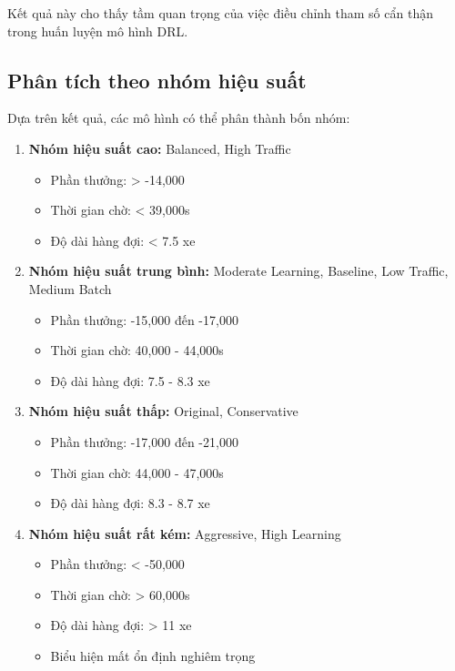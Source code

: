 Kết quả này cho thấy tầm quan trọng của việc điều chỉnh tham số cẩn thận trong huấn luyện mô hình DRL.

\subsection{Phân tích theo nhóm hiệu suất}

Dựa trên kết quả, các mô hình có thể phân thành bốn nhóm:

\begin{enumerate}
    \item \textbf{Nhóm hiệu suất cao:} Balanced, High Traffic
    \begin{itemize}
        \item Phần thưởng: > -14,000
        \item Thời gian chờ: < 39,000s
        \item Độ dài hàng đợi: < 7.5 xe
    \end{itemize}
    
    \item \textbf{Nhóm hiệu suất trung bình:} Moderate Learning, Baseline, Low Traffic, Medium Batch
    \begin{itemize}
        \item Phần thưởng: -15,000 đến -17,000
        \item Thời gian chờ: 40,000 - 44,000s
        \item Độ dài hàng đợi: 7.5 - 8.3 xe
    \end{itemize}
    
    \item \textbf{Nhóm hiệu suất thấp:} Original, Conservative
    \begin{itemize}
        \item Phần thưởng: -17,000 đến -21,000
        \item Thời gian chờ: 44,000 - 47,000s
        \item Độ dài hàng đợi: 8.3 - 8.7 xe
    \end{itemize}
    
    \item \textbf{Nhóm hiệu suất rất kém:} Aggressive, High Learning
    \begin{itemize}
        \item Phần thưởng: < -50,000
        \item Thời gian chờ: > 60,000s
        \item Độ dài hàng đợi: > 11 xe
        \item Biểu hiện mất ổn định nghiêm trọng
    \end{itemize}
\end{enumerate}

